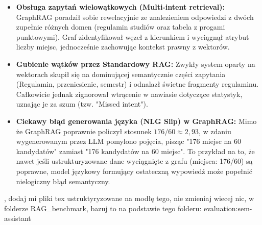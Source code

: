 \begin{tcolorbox}[colback=green!5!white,colframe=green!50!black,title=Wnioski i obserwacje]
    \begin{itemize}
        \item \textbf{Obsługa zapytań wielowątkowych (Multi-intent retrieval):} GraphRAG poradził sobie rewelacyjnie ze znalezieniem odpowiedzi z dwóch zupełnie różnych domen (regulamin studiów oraz tabela z progami punktowymi). Graf zidentyfikował węzeł z kierunkiem i wyciągnął atrybut liczby miejsc, jednocześnie zachowując kontekst prawny z wektorów.
        \item \textbf{Gubienie wątków przez Standardowy RAG:} Zwykły system oparty na wektorach skupił się na dominującej semantycznie części zapytania (Regulamin, przeniesienie, semestr) i odnalazł świetne fragmenty regulaminu. Całkowicie jednak zignorował wtrącenie w nawiasie dotyczące statystyk, uznając je za szum (tzw. "Missed intent").
        \item \textbf{Ciekawy błąd generowania języka (NLG Slip) w GraphRAG:} Mimo że GraphRAG poprawnie policzył stosunek $176 / 60 \approx 2,93$, w zdaniu wygenerowanym przez LLM pomylono pojęcia, pisząc "176 miejsc na 60 kandydatów" zamiast "176 kandydatów na 60 miejsc". To przykład na to, że nawet jeśli ustrukturyzowane dane wyciągnięte z grafu (miejsca: 176/60) są poprawne, model językowy formujący ostateczną wypowiedź może popełnić nielogiczny błąd semantyczny.
    \end{itemize}
\end{tcolorbox}
\vspace{1em}, dodaj mi pliki tex ustruktyryzowane na modłę tego, nie zmieniaj wiecej nic, w folderze RAG_benchmark, bazuj to na podstawie tego folderu: evaluation\results\compare\tracesC:\Users\wolny\Documents\projects\agh\6sem\lrag-assistant\evaluation\results\compare\traces